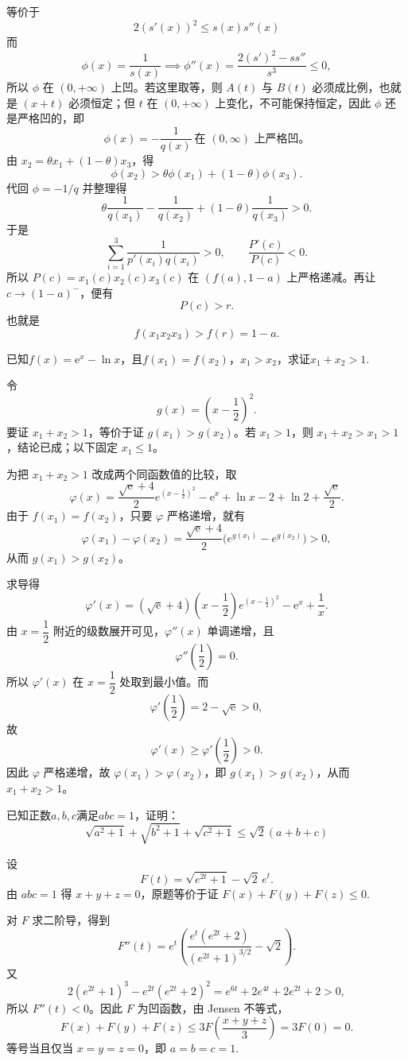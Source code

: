 \begin{solution}
\[\]
等价于
\[2(s'(x))^2\le s(x)s''(x)\]
而
\[
\phi(x)=\frac{1}{s(x)}\implies \phi''(x)=\frac{2(s')^2-ss''}{s^3}\le 0,
\]
所以 $\phi$ 在 $(0,+\infty)$ 上凹。若这里取等，则 $A(t)$ 与 $B(t)$ 必须成比例，也就是 $(x+t)$ 必须恒定；但 \(t\) 在 \((0,+\infty)\) 上变化，不可能保持恒定，因此 \(\phi\) 还是严格凹的，即
\[
\phi(x)=-\frac{1}{q(x)}\ \text{在 }(0,\infty)\text{ 上严格凹。}
\]
由 $x_2=\theta x_1+(1-\theta)x_3$，得
\[
\phi(x_2)>\theta\phi(x_1)+(1-\theta)\phi(x_3).
\]
代回 $\phi=-1/q$ 并整理得
\[
\theta\frac1{q(x_1)}-\frac1{q(x_2)}+(1-\theta)\frac1{q(x_3)}>0.
\]
于是
\[
\sum_{i=1}^3\frac{1}{p'(x_i)q(x_i)}>0,
\qquad
\frac{P'(c)}{P(c)}<0.
\]
所以 $P(c)=x_1(c)x_2(c)x_3(c)$ 在 $(f(a),1-a)$ 上严格递减。再让 $c\to(1-a)^-$，便有
\[
P(c)>r.
\]
也就是
\[
f(x_1x_2x_3)>f(r)=1-a.
\]
\end{solution}  





\begin{example}[（群友供题）]
    已知$f(x)=\text{e}^x-\ln x$，且$f(x_1)=f(x_2)$，$x_1>x_2$，求证$x_1+x_2>1$.
\end{example}
\begin{solution}
令
\[
g(x)=\left(x-\dfrac12\right)^2.
\]
要证 $x_1+x_2>1$，等价于证 $g(x_1)>g(x_2)$。若 $x_1>1$，则 $x_1+x_2>x_1>1$，结论已成；以下固定 $x_1\le1$。

为把 $x_1+x_2>1$ 改成两个同函数值的比较，取
\[
\varphi(x)=\dfrac{\sqrt{\text{e}}+4}{2}e^{(x-\frac12)^2}-\text{e}^x+\ln x-2+\ln 2+\dfrac{\sqrt{\text{e}}}{2}.
\]
由于 $f(x_1)=f(x_2)$，只要 $\varphi$ 严格递增，就有
\[
\varphi(x_1)-\varphi(x_2)=\frac{\sqrt{\text{e}}+4}{2}\bigl(e^{g(x_1)}-e^{g(x_2)}\bigr)>0,
\]
从而 $g(x_1)>g(x_2)$。

求导得
\[
\varphi'(x)=(\sqrt{\text{e}}+4)\left(x-\dfrac12\right)e^{(x-\frac12)^2}-\text{e}^x+\dfrac1x.
\]
由 $x=\dfrac12$ 附近的级数展开可见，$\varphi''(x)$ 单调递增，且
\[
\varphi''\!\left(\dfrac12\right)=0.
\]
所以 $\varphi'(x)$ 在 $x=\dfrac12$ 处取到最小值。而
\[
\varphi'\!\left(\dfrac12\right)=2-\sqrt{\text{e}}>0,
\]
故
\[
\varphi'(x)\ge\varphi'\!\left(\dfrac12\right)>0.
\]
因此 $\varphi$ 严格递增，故 $\varphi(x_1)>\varphi(x_2)$，即 $g(x_1)>g(x_2)$，从而 $x_1+x_2>1$。
\end{solution}
\newpage
\begin{example}
    已知正数$a,b,c$满足$abc=1$，证明：\[\sqrt{a^2+1}+\sqrt{b^2+1}+\sqrt{c^2+1}\leqslant\sqrt{2}\left(a+b+c\right)\]
\end{example}
\begin{solution}
    设
    \[
    F(t)=\sqrt{e^{2t}+1}-\sqrt2\,e^t.
    \]
    由 \(abc=1\) 得 \(x+y+z=0\)，原题等价于证 \(F(x)+F(y)+F(z)\le 0\).

    对 $F$ 求二阶导，得到
    \[
    F''(t)=e^t\left(\frac{e^t(e^{2t}+2)}{(e^{2t}+1)^{3/2}}-\sqrt2\right).
    \]
    又
    \[
    2(e^{2t}+1)^3-e^{2t}(e^{2t}+2)^2=e^{6t}+2e^{4t}+2e^{2t}+2>0,
    \]
    所以 \(F''(t)<0\)。因此 \(F\) 为凹函数，由 Jensen 不等式，
    \[
    F(x)+F(y)+F(z)\le 3F\!\left(\frac{x+y+z}{3}\right)=3F(0)=0.
    \]
    等号当且仅当 \(x=y=z=0\)，即 \(a=b=c=1\).
\end{solution}

